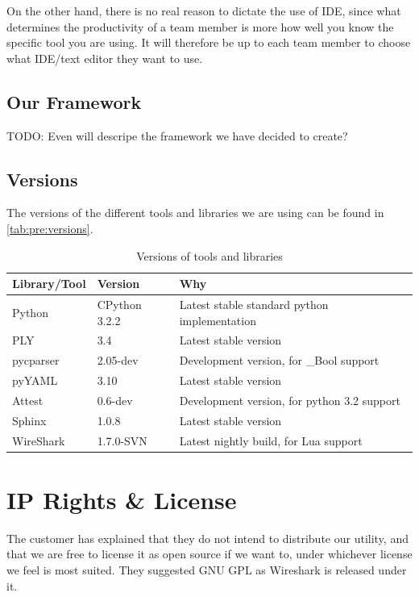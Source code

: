 On the other hand, there is no real reason to dictate the use of IDE, since
what determines the productivity of a team member is more how well you know
the specific tool you are using. It will therefore be up to each team member
to choose what IDE/text editor they want to use.

\subsection{Our Framework}
\label{sec:pre:framework}
TODO: Even will descripe the framework we have decided to create?

\subsection{Versions}
\label{sec:pre:versions}
The versions of the different tools and libraries we are using can be found in
\autoref{tab:pre:versions}.
\begin{table}[!h] \footnotesize \center
\vspace{-10pt}
\caption{Versions of tools and libraries\label{tab:pre:versions}}
\begin{tabular}{l l l}
	\toprule
	Library/Tool & Version & Why \\
	\midrule
	Python & CPython 3.2.2 & Latest stable standard python implementation \\
	PLY & 3.4 & Latest stable version \\
	pycparser & 2.05-dev & Development version, for \_Bool support \\
	pyYAML & 3.10 & Latest stable version \\
	Attest & 0.6-dev & Development version, for python 3.2 support \\
	Sphinx & 1.0.8 & Latest stable version \\
	WireShark & 1.7.0-SVN & Latest nightly build, for Lua support \\
	\bottomrule
\end{tabular}
\vspace{-10pt}
\end{table}


\section{IP Rights \& License}
\label{sec:pre:license}
The customer has explained that they do not intend to distribute our utility,
and that we are free to license it as open source if we want to, under
whichever license we feel is most suited. They suggested GNU GPL as Wireshark
is released under it.

